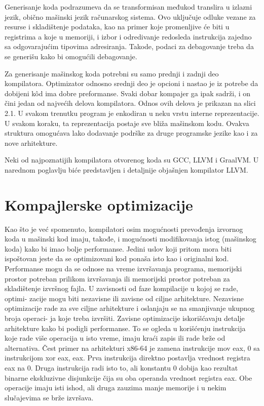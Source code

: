 \documentclass[12pt,oneside]{memoir}
\begin{document}
Generisanje koda podrazumeva da se transformisan međukod translira u izlazni 
jezik, obično mašinski jezik računarskog sistema. Ovo uključuje odluke vezane 
za resurse i skladištenje podataka, kao na primer koje promenljive će biti u 
registrima a koje u memoriji, i izbor i odredivanje redosleda instrukcija 
zajedno sa odgovarajućim tipovima adresiranja. Takode, podaci za debagovanje 
treba da se generišu kako bi omogućili debagovanje.

Za generisanje mašinskog koda potrebni su samo prednji i zadnji deo kompilatora. Optimizator odnosno srednji deo je opcioni i nastao je iz potrebe da dobijeni kôd ima dobre preformanse. Svaki dobar kompajer ga ipak sadrži, i on čini jedan od najvećih delova kompilatora. Odnos
ovih delova je prikazan na slici 2.1. U svakom trenutku program je enkodiran u neku
vrstu interne reprezentacije. U svakom koraku, ta reprezentacija postaje sve bliža mašinskom kodu. Ovakva struktura omogućava lako dodavanje podrške za druge programske jezike kao i za nove arhitekture.

Neki od najpoznatijih kompilatora otvorenog koda su GCC, LLVM i GraalVM. U 
narednom poglavlju biće predstavljen i detaljnije objašnjen kompilator LLVM.

\section{Kompajlerske optimizacije}
Kao što je već spomenuto, kompilatori osim mogućnosti prevođenja izvornog koda u mašinski kod imaju, takođe, i mogućnosti modifikovanja istog (mašinskog koda) kako bi imao bolje performanse.
Jedini uslov koji pritom mora biti ispoštovan jeste da se optimizovani kod ponaša isto kao i originalni kod. Performanse mogu da se odnose na vreme izvršavanja programa,
memorijski prostor potreban prilikom izvršavanja ili memorijski prostor potreban za
skladištenje izvršnog fajla. U zavisnosti od faze kompilacije u kojoj se rade, optimi-
zacije mogu biti nezavisne ili zavisne od ciljne arhitekture. Nezavisne optimizacije
rade za sve ciljne arhitekture i oslanjaju se na smanjivanje ukupnog broja operaci-
ja koje treba izvršiti. Zavisne optimizacije iskorišćavaju detalje arhitekture kako bi
podigli performanse. To se ogleda u korišćenju instrukcija koje rade više operacija u
isto vreme, imaju kraći zapis ili rade brže od alternativa. Čest primer na arhitekturi
x86-64 je zamena instrukcije mov eax, 0 sa instrukcijom xor eax, eax. 
Prva instrukcija direktno postavlja vrednost registra eax na 0. Druga instrukcija radi isto
to, ali konstantu 0 dobija kao rezultat binarne ekskluzivne disjunkcije čija su oba
operanda vrednost registra eax. Obe operacije imaju isti ishod, ali druga zauzima
manje memorije i u nekim slučajevima se brže izvršava.
\end{document}
